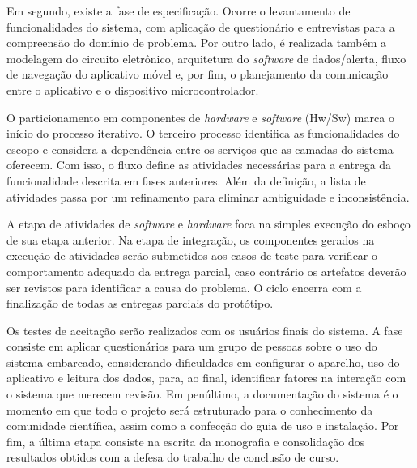 Em segundo, existe a fase de especificação. Ocorre o levantamento de funcionalidades do sistema, com aplicação de questionário 
e entrevistas para a compreensão do domínio de problema. Por outro lado, é realizada também a modelagem do circuito 
eletrônico, arquitetura do \textit{software} de dados/alerta, fluxo de navegação do aplicativo móvel e, por fim, o 
planejamento da comunicação entre o aplicativo e o dispositivo microcontrolador.

O particionamento em componentes de \textit{hardware} e \textit{software} (Hw/Sw) marca o início do processo iterativo. O terceiro 
processo identifica as funcionalidades do escopo e considera a dependência entre os serviços que as camadas do sistema oferecem. Com isso, 
o fluxo define as atividades necessárias para a entrega da funcionalidade descrita em fases anteriores. Além da definição, a lista de atividades passa 
por um refinamento para eliminar ambiguidade e inconsistência.

A etapa de atividades de \textit{software} e \textit{hardware} foca na simples execução do esboço de sua etapa anterior. Na etapa de integração, os componentes gerados na execução de atividades 
serão submetidos aos casos de teste para verificar o comportamento adequado da entrega parcial, caso contrário os artefatos 
deverão ser revistos para identificar a causa do problema. O ciclo encerra com a finalização de todas as entregas parciais do protótipo.

Os testes de aceitação serão realizados com os usuários finais do sistema. A fase consiste em aplicar questionários para um grupo de pessoas sobre o uso 
do sistema embarcado, considerando dificuldades em configurar o aparelho, uso do aplicativo e leitura dos dados, para, ao final, identificar fatores na interação com o sistema que 
merecem revisão. Em penúltimo, a documentação do sistema é o momento em que todo o projeto será estruturado para o conhecimento da comunidade científica, assim como a confecção do guia 
de uso e instalação. Por fim, a última etapa consiste na escrita da monografia e consolidação dos resultados obtidos com a defesa do trabalho de conclusão de curso.